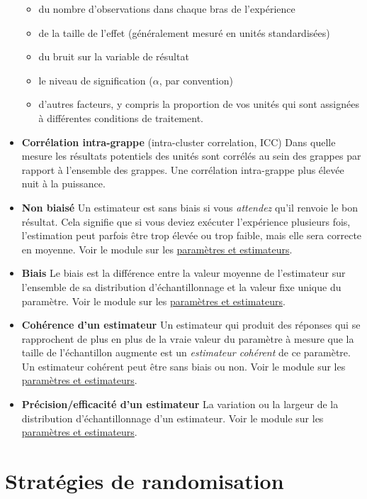 \documentclass[
  12pt,
]{book}
\providecommand{\tightlist}{%
  \setlength{\itemsep}{0pt}\setlength{\parskip}{0pt}}
\begin{document}
\begin{itemize}
  \begin{itemize}
  \tightlist
  \item
    du nombre d'observations dans chaque bras de l'expérience
  \item
    de la taille de l'effet (généralement mesuré en unités standardisées)
  \item
    du bruit sur la variable de résultat
  \item
    le niveau de signification (\(\alpha\), par convention)
  \item
    d'autres facteurs, y compris la proportion de vos unités qui sont assignées à différentes conditions de traitement.
  \end{itemize}
\item
  \textbf{Corrélation intra-grappe} (intra-cluster correlation, ICC) Dans quelle mesure les résultats potentiels des unités sont corrélés au sein des grappes par rapport à l'ensemble des grappes. Une corrélation intra-grappe plus élevée nuit à la puissance.
\item
  \textbf{Non biaisé} Un estimateur est sans biais si vous \emph{attendez} qu'il renvoie le bon résultat. Cela signifie que si vous deviez exécuter l'expérience plusieurs fois,
  l'estimation peut parfois être trop élevée ou trop faible, mais elle sera correcte en moyenne. Voir le module sur les \href{paramètres-et-estimateurs.html}{paramètres et estimateurs}.
\item
  \textbf{Biais} Le biais est la différence entre la valeur moyenne de l'estimateur sur l'ensemble de sa distribution d'échantillonnage et la valeur fixe unique du paramètre.
  Voir le module sur les \href{paramètres-et-estimateurs.html}{paramètres et estimateurs}.
\item
  \textbf{Cohérence d'un estimateur} Un estimateur qui produit des réponses qui se rapprochent de plus en plus de la vraie valeur du paramètre à mesure que la taille de l'échantillon augmente est un \emph{estimateur cohérent} de ce paramètre. Un estimateur cohérent peut être sans biais ou non.
  Voir le module sur les \href{paramètres-et-estimateurs.html}{paramètres et estimateurs}.
\item
  \textbf{Précision/efficacité d'un estimateur} La variation ou la largeur de la distribution d'échantillonnage d'un estimateur. Voir le module sur les \href{paramètres-et-estimateurs.html}{paramètres et estimateurs}.
\end{itemize}

\hypertarget{stratuxe9gies-de-randomisation}{%
\section{Stratégies de randomisation}\label{stratuxe9gies-de-randomisation}}
\end{document}

